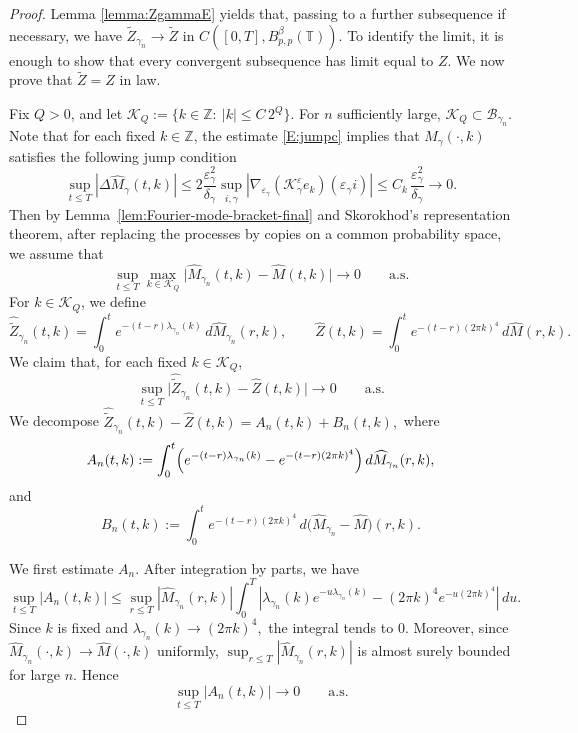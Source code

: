 \documentclass{article}
\begin{document}
\begin{proof}
Lemma \ref{lemma:ZgammaE} yields that, passing to a further subsequence if necessary, we have
\(
\widetilde Z_{\gamma_n}\rightarrow \widetilde Z \)
in $C([0,T],B^\beta_{p,p}(\mathbb T))$.
To identify the limit, it is enough to show that every convergent subsequence has limit equal to \(Z\).
We now prove that \(\widetilde Z=Z\) in law.

Fix \(Q > 0\), and let
\(
\mathcal K_Q:=\{k\in\mathbb Z:\ |k|\le C\,2^Q\}.
\)
For \(n\) sufficiently large, \(\mathcal K_Q\subset \mathcal B_{\gamma_n}\).
Note that for each fixed \(k\in\mathbb Z\), the estimate \eqref{E:jumpc} implies that $M_\gamma(\cdot,k)$ satisfies the following jump condition
\[
\sup_{t\le T}|\Delta \widehat M_\gamma(t,k)| \le 2\frac{\varepsilon_\gamma^2}{\delta_\gamma} \sup_{i,\gamma}|\nabla_{\varepsilon_\gamma}(\mathcal K_\gamma^\varepsilon e_k)(\varepsilon_\gamma i)|
\le
C_k\,\frac{\varepsilon_\gamma^2}{\delta_\gamma} \to 0.
\]
Then by Lemma~\ref{lem:Fourier-mode-bracket-final} and Skorokhod's representation theorem, after replacing the processes by copies on a common probability space,
we assume that
\[
\sup_{t\le T}
\max_{k\in\mathcal K_Q}
\bigl|
\widehat M_{\gamma_n}(t,k)-\widehat M(t,k)
\bigr|
\longrightarrow0
\qquad\text{a.s.}
\]
For \(k\in\mathcal K_Q\), we define
\[
\widehat{\widetilde Z}_{\gamma_n}(t,k)
=
\int_0^t e^{-(t-r)\lambda_{\gamma_n}(k)}\,d\widehat M_{\gamma_n}(r,k),
\qquad
\widehat Z(t,k)
=
\int_0^t e^{-(t-r)(2\pi k)^4}\,d\widehat M(r,k).
\]
We claim that, for each fixed \(k\in\mathcal K_Q\),
\[
\sup_{t\le T}
\bigl|
\widehat{\widetilde Z}_{\gamma_n}(t,k)-\widehat Z(t,k)
\bigr|
\rightarrow0
\qquad\text{a.s.}
\]
We decompose
\(
\widehat{\widetilde Z}_{\gamma_n}(t,k)-\widehat Z(t,k)
=
A_n(t,k)+B_n(t,k),
\)
where
\[
A_n(t,k)
:=
\int_0^t
\Bigl(
e^{-(t-r)\lambda_{\gamma_n}(k)}
-
e^{-(t-r)(2\pi k)^4}
\Bigr)\,d\widehat M_{\gamma_n}(r,k),
\]
and
\[
B_n(t,k)
:=
\int_0^t e^{-(t-r)(2\pi k)^4}\,d\bigl(\widehat M_{\gamma_n}-\widehat M\bigr)(r,k).
\]

We first estimate \(A_n\). After integration by parts, we have
\[
\sup_{t\le T}|A_n(t,k)|
\le
\sup_{r\le T}|\widehat M_{\gamma_n}(r,k)|
\int_0^T
\left|
\lambda_{\gamma_n}(k)e^{-u\lambda_{\gamma_n}(k)}
-(2\pi k)^4e^{-u(2\pi k)^4}
\right|\,du.
\]
Since \(k\) is fixed and \(
\lambda_{\gamma_n}(k)\longrightarrow (2\pi k)^4,
\)
the integral tends to \(0\). Moreover, since \(\widehat M_{\gamma_n}(\cdot,k)\to \widehat M(\cdot,k)\) uniformly,
\(
\sup_{r\le T}|\widehat M_{\gamma_n}(r,k)|
\)
is almost surely bounded for large \(n\).
Hence
\[
\sup_{t\le T}|A_n(t,k)|\longrightarrow0
\qquad\text{a.s.}
\]


\end{proof}
\end{document}
